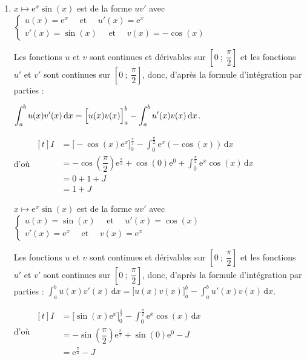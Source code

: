 \documentclass[10pt]{article}
\providecommand{\e}{{\mathrm{e}}}
\begin{document}
\begin{enumerate}
\item

$x \longmapsto \e^x \sin(x)$ est de la forme $u v'$ avec $\begin{cases}u(x)=\e^x \quad\text { et }  \quad u'(x)=\e^x \\ v'(x)=\sin(x) \quad\text { et } \quad v(x)=-\cos(x)\end{cases}$

Les fonctions $u$ et $v$ sont continues et dérivables sur $\left[0~;~\dfrac{\pi}{2}\right]$ et les fonctions $u'$ et $v'$ sont continues sur $\left[0~;~\dfrac{\pi}{2}\right]$, donc, d'après la formule d'intégration par parties :

$\displaystyle \int_{a}^{b} u(x)v'(x)\, \mathrm{d}x = \Big [ u(x)v(x)\strut\Big]_{a}^{b} - \int_{a}^{b} u'(x)v(x) \, \mathrm{d}x$.

d'où 
$\begin{aligned}[t]
	I & =\Big[-\cos(x)\e^x\Big]_0^{\frac{\pi}{2}}-\int_0^{\frac{\pi}{2}} \e^x(-\cos(x))  \, \mathrm{d}x\\
	& = -\cos \left(\dfrac{\pi}{2}\right)\e^{\frac{\pi}{2}}+\cos(0)\e^0+\int_0^{\frac{\pi}{2}} \e^x\cos(x) \, \mathrm{d}x\\
	& =0+1+J\\
	& =1+ J
\end{aligned}$

\smallskip

$x \longmapsto \e^x \sin(x)$ est de la forme $u v'$ avec $\begin{cases}u(x)=\sin(x) \quad\text { et }\quad u'(x)=\cos(x)\\ v'(x)=\e^x \quad \text { et } \quad v(x)=\e^x \end{cases}$

Les fonctions $u$ et $v$ sont continues et dérivables sur $\left[0~;~\dfrac{\pi}{2}\right]$ et  les fonctions $u'$ et $v'$ sont continues sur $\left[0~;~\dfrac{\pi}{2}\right]$, donc, d'après la formule d'intégration par parties :
$\displaystyle \int_{a}^{b} u(x)v'(x)\, \mathrm{d}x = \Big [ u(x)v(x)\Big]_{a}^{b} - \int_{a}^{b} u'(x)v(x) \, \mathrm{d}x$.

d'où 
$\begin{aligned}[t]
	I & =\Big[\sin(x)\e^x\Big]_0^{\frac{\pi}{2}}-\int_0^{\frac{\pi}{2}} \e^x\cos(x)  \, \mathrm{d}x \\
	& = -\sin \left(\dfrac{\pi}{2}\right)\e^{\frac{\pi}{2}}+\sin(0)\e^0-J\\
	& =\e^{\frac{\pi}{2}} - J
\end{aligned}
$


\end{enumerate}
\end{document}
